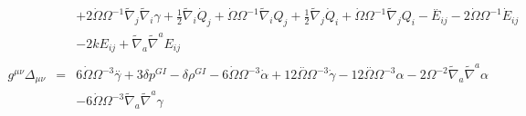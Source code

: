 \documentclass[10pt,letterpaper]{article}
\numberwithin{equation}{section}
\begin{document}
\begin{eqnarray}
&& + 2 \dot{\Omega} \Omega^{-1} \tilde{\nabla}_{j}\tilde{\nabla}_{i}\gamma +\tfrac{1}{2} \tilde{\nabla}_{i}\dot{Q}_{j} + \dot{\Omega} \Omega^{-1} \tilde{\nabla}_{i}Q_{j} + \tfrac{1}{2} \tilde{\nabla}_{j}\dot{Q}_{i} + \dot{\Omega} \Omega^{-1} \tilde{\nabla}_{j}Q_{i}- \overset{..}{E}_{ij} - 2 \dot{\Omega} \Omega^{-1} \dot{E}_{ij} \nonumber \\ 
&& - 2 k E_{ij} + \tilde{\nabla}_{a}\tilde{\nabla}^{a}E_{ij}
\\  \nonumber\\ 
g^{\mu\nu}\Delta_{\mu\nu}&=& 6 \dot{\Omega} \Omega^{-3} \overset{..}{\gamma} + 3 \delta p^{GI}{} -  \delta \rho^{GI}{} - 6 \dot{\Omega} \Omega^{-3} \dot{\alpha} + 12 \overset{..}{\Omega} \Omega^{-3} \dot{\gamma} - 12 \overset{..}{\Omega} \Omega^{-3} \alpha - 2 \Omega^{-2} \tilde{\nabla}_{a}\tilde{\nabla}^{a}\alpha \nonumber \\ 
&& - 6 \dot{\Omega} \Omega^{-3} \tilde{\nabla}_{a}\tilde{\nabla}^{a}\gamma 
\end{eqnarray}


\end{document}
